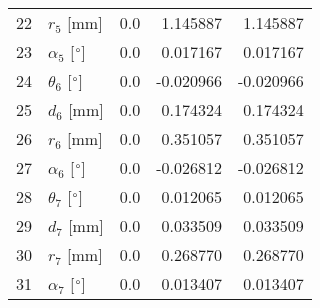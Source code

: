 \documentclass{standalone}%
\begin{document}
\begin{tabular}{llrrr}
22 &              $r_{5}$ [mm] &      0.0 &   1.145887 &   1.145887 \\
23 &  $\alpha_{5}$ [$\degree$] &      0.0 &   0.017167 &   0.017167 \\
24 &  $\theta_{6}$ [$\degree$] &      0.0 &  -0.020966 &  -0.020966 \\
25 &              $d_{6}$ [mm] &      0.0 &   0.174324 &   0.174324 \\
26 &              $r_{6}$ [mm] &      0.0 &   0.351057 &   0.351057 \\
27 &  $\alpha_{6}$ [$\degree$] &      0.0 &  -0.026812 &  -0.026812 \\
28 &  $\theta_{7}$ [$\degree$] &      0.0 &   0.012065 &   0.012065 \\
29 &              $d_{7}$ [mm] &      0.0 &   0.033509 &   0.033509 \\
30 &              $r_{7}$ [mm] &      0.0 &   0.268770 &   0.268770 \\
31 &  $\alpha_{7}$ [$\degree$] &      0.0 &   0.013407 &   0.013407 \\
\bottomrule
\end{tabular}
%
\end{document}
